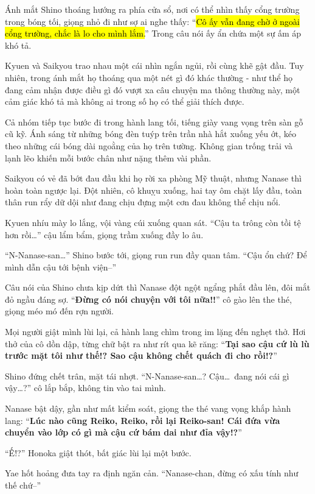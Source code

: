 \documentclass[../main.tex]{subfiles}
\begin{document}
Ánh mắt Shino thoáng hướng ra phía cửa sổ, nơi có thể nhìn thấy cổng trường trong bóng tối, giọng nhỏ đi như sợ ai nghe thấy: ``\hl{Cô ấy vẫn đang chờ ở ngoài cổng trường, chắc là lo cho mình lắm.}'' Trong câu nói ấy ẩn chứa một sự ấm áp khó tả.

Kyuen và Saikyou trao nhau một cái nhìn ngắn ngủi, rồi cùng khẽ gật đầu. Tuy nhiên, trong ánh mắt họ thoáng qua một nét gì đó khác thường - như thể họ đang cảm nhận được điều gì đó vượt xa câu chuyện ma thông thường này, một cảm giác khó tả mà không ai trong số họ có thể giải thích được.

Cả nhóm tiếp tục bước đi trong hành lang tối, tiếng giày vang vọng trên sàn gỗ cũ kỹ. Ánh sáng từ những bóng đèn tuýp trên trần nhà hắt xuống yếu ớt, kéo theo những cái bóng dài ngoằng của họ trên tường. Không gian trống trải và lạnh lẽo khiến mỗi bước chân như nặng thêm vài phần.

Saikyou có vẻ đã bớt đau đầu khi họ rời xa phòng Mỹ thuật, nhưng Nanase thì hoàn toàn ngược lại. Đột nhiên, cô khuỵu xuống, hai tay ôm chặt lấy đầu, toàn thân run rẩy dữ dội như đang chịu đựng một cơn đau không thể chịu nổi.

Kyuen nhíu mày lo lắng, vội vàng cúi xuống quan sát. ``Cậu ta trông còn tồi tệ hơn rồi\dots'' cậu lẩm bẩm, giọng trầm xuống đầy lo âu.

``N-Nanase-san\dots'' Shino bước tới, giọng run run đầy quan tâm. ``Cậu ổn chứ? Để mình dẫn cậu tới bệnh viện--''

Câu nói của Shino chưa kịp dứt thì Nanase đột ngột ngẩng phắt đầu lên, đôi mắt đỏ ngầu đáng sợ. ``\textbf{Đừng có nói chuyện với tôi nữa!!}'' cô gào lên the thé, giọng méo mó đến rợn người.

Mọi người giật mình lùi lại, cả hành lang chìm trong im lặng đến nghẹt thở. Hơi thở của cô dồn dập, từng chữ bật ra như rít qua kẽ răng: ``\textbf{Tại sao cậu cứ lù lù trước mặt tôi như thế!? Sao cậu không chết quách đi cho rồi!?}''

Shino đứng chết trân, mặt tái nhợt. ``N-Nanase-san\dots? Cậu\dots\ đang nói cái gì vậy\dots?'' cô lắp bắp, không tin vào tai mình.

Nanase bật dậy, gần như mất kiểm soát, giọng the thé vang vọng khắp hành lang: ``\textbf{Lúc nào cũng Reiko, Reiko, rồi lại Reiko-san! Cái đứa vừa chuyển vào lớp có gì mà cậu cứ bám dai như đỉa vậy!?}''

``Ế!?'' Honoka giật thót, bất giác lùi lại một bước.

Yae hốt hoảng đưa tay ra định ngăn cản. ``Nanase-chan, đừng có xấu tính như thế chứ--''
\end{document}
